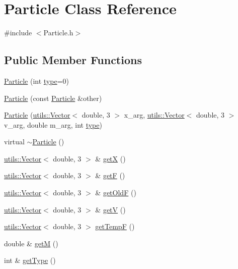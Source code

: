 \hypertarget{classParticle}{\section{Particle Class Reference}
\label{classParticle}
}


{\ttfamily \#include $<$Particle.\-h$>$}

\subsection*{Public Member Functions}
\begin{DoxyCompactItemize}
\item 
\hyperlink{classParticle_a866812d3dfb9c539e5e24593e596a8c9}{Particle} (int \hyperlink{classtype}{type}=0)
\item 
\hyperlink{classParticle_a24b04cb7c6f7ea4242d25c410f44ae56}{Particle} (const \hyperlink{classParticle}{Particle} \&other)
\item 
\hyperlink{classParticle_ab1cd2d4c36a52cb9ea5755340aceafe0}{Particle} (\hyperlink{classutils_1_1Vector}{utils\-::\-Vector}$<$ double, 3 $>$ x\-\_\-arg, \hyperlink{classutils_1_1Vector}{utils\-::\-Vector}$<$ double, 3 $>$ v\-\_\-arg, double m\-\_\-arg, int \hyperlink{classtype}{type})
\item 
virtual \hyperlink{classParticle_ad030d0fe7b88cf81744b127c99244ff4}{$\sim$\-Particle} ()
\item 
\hyperlink{classutils_1_1Vector}{utils\-::\-Vector}$<$ double, 3 $>$ \& \hyperlink{classParticle_ab7ade5dc156dfa0234aa0323564e46ed}{get\-X} ()
\item 
\hyperlink{classutils_1_1Vector}{utils\-::\-Vector}$<$ double, 3 $>$ \& \hyperlink{classParticle_acd84c445e2bd5f5280a00e76cfe73fe0}{get\-F} ()
\item 
\hyperlink{classutils_1_1Vector}{utils\-::\-Vector}$<$ double, 3 $>$ \& \hyperlink{classParticle_a1204435fc08c697b0fea230616d1bbdf}{get\-Old\-F} ()
\item 
\hyperlink{classutils_1_1Vector}{utils\-::\-Vector}$<$ double, 3 $>$ \& \hyperlink{classParticle_aaf3ecbc6e1e31b259fe239461ba13dbd}{get\-V} ()
\item 
\hyperlink{classutils_1_1Vector}{utils\-::\-Vector}$<$ double, 3 $>$ \hyperlink{classParticle_aab82b05d8e3be6f085430e0b8b957eaa}{get\-Temp\-F} ()
\item 
double \& \hyperlink{classParticle_a88ac76c41c96b8df6de3e0bc14edbbc8}{get\-M} ()
\item 
int \& \hyperlink{classParticle_abf02d7c78c7d9c1944a066816f9a7139}{get\-Type} ()

\end{DoxyCompactItemize}
